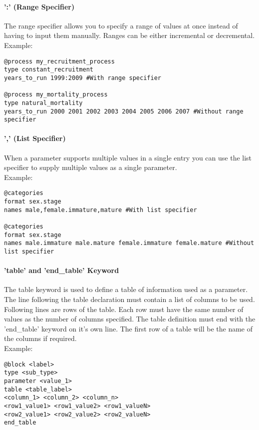 \paragraph*{':' (Range Specifier)}
The range specifier allows you to specify a range of values at once instead of having to input them manually. Ranges can be either incremental or decremental.\\
Example:
{\small{\begin{verbatim}
@process my_recruitment_process
type constant_recruitment
years_to_run 1999:2009 #With range specifier

@process my_mortality_process
type natural_mortality
years_to_run 2000 2001 2002 2003 2004 2005 2006 2007 #Without range specifier
\end{verbatim}}}

\paragraph*{',' (List Specifier)}
When a parameter supports multiple values in a single entry you can use the list specifier to supply multiple values as a single parameter.\\
Example:
{\small{\begin{verbatim}
@categories
format sex.stage
names male,female.immature,mature #With list specifier

@categories
format sex.stage
names male.immature male.mature female.immature female.mature #Without list specifier
\end{verbatim}}}

\paragraph*{'table' and 'end\_table' Keyword}
The table keyword is used to define a table of information used as a parameter. The line following the table declaration must contain a list of columns to be used. Following lines are rows of the table. Each row must have the same number of values as the number of columns specified.
The table definition must end with the 'end\_table' keyword on it's own line.
The first row of a table will be the name of the columns if required.\\
Example:
{\small{\begin{verbatim}
@block <label>
type <sub_type>
parameter <value_1>
table <table_label>
<column_1> <column_2> <column_n>
<row1_value1> <row1_value2> <row1_valueN>
<row2_value1> <row2_value2> <row2_valueN>
end_table
\end{verbatim}}}

